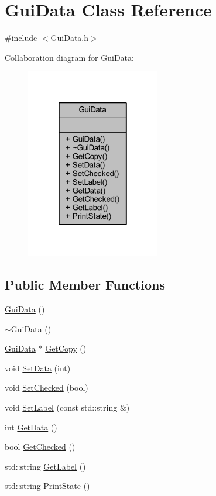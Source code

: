\hypertarget{class_gui_data}{}\section{Gui\+Data Class Reference}
\label{class_gui_data}


{\ttfamily \#include $<$Gui\+Data.\+h$>$}



Collaboration diagram for Gui\+Data\+:
\nopagebreak
\begin{figure}[H]
\begin{center}
\leavevmode
\includegraphics[width=166pt]{class_gui_data__coll__graph}
\end{center}
\end{figure}
\subsection*{Public Member Functions}
\begin{DoxyCompactItemize}
\item 
\mbox{\hyperlink{class_gui_data_a7181d016e549441240fd6de9f5bcacc3}{Gui\+Data}} ()
\item 
\mbox{\hyperlink{class_gui_data_a15a76a20e98eabd9b41d0b6a16ec5e06}{$\sim$\+Gui\+Data}} ()
\item 
\mbox{\hyperlink{class_gui_data}{Gui\+Data}} $\ast$ \mbox{\hyperlink{class_gui_data_acaa63c8056ac7be58f10356c1985e6b8}{Get\+Copy}} ()
\item 
void \mbox{\hyperlink{class_gui_data_a1d1537dd256a5ee90e55382b464e3aaf}{Set\+Data}} (int)
\item 
void \mbox{\hyperlink{class_gui_data_a8e95e2fd1ffd33f993d02e8e24f7c000}{Set\+Checked}} (bool)
\item 
void \mbox{\hyperlink{class_gui_data_a18b0d69cc528e0a2eb58ac8813b3ad34}{Set\+Label}} (const std\+::string \&)
\item 
int \mbox{\hyperlink{class_gui_data_a749da21494ab07b9b418bcb5336c80e7}{Get\+Data}} ()
\item 
bool \mbox{\hyperlink{class_gui_data_a18e0ba6efaf07646982350b14e78def3}{Get\+Checked}} ()
\item 
std\+::string \mbox{\hyperlink{class_gui_data_a75bee9d688d53423efcd6d4b0fb46e62}{Get\+Label}} ()
\item 
std\+::string \mbox{\hyperlink{class_gui_data_a0727523004840e82130d0db902e0b53f}{Print\+State}} ()
\end{DoxyCompactItemize}
